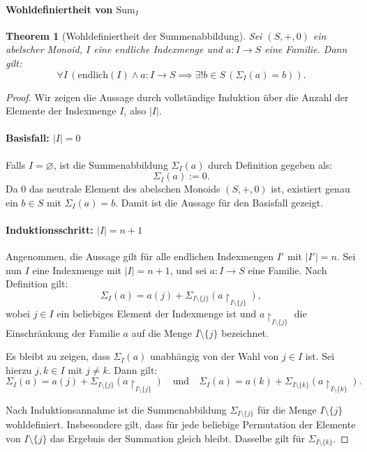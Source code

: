 \documentclass{book}
\theoremstyle{plain}
\newtheorem{theorem}{Theorem}
\theoremstyle{remark}
\theoremstyle{definition}
\begin{document}
\paragraph{Wohldefiniertheit von \(\text{Sum}_I\)}
\begin{theorem}[Wohldefiniertheit der Summenabbildung]
Sei \((S, +, 0)\) ein abelscher Monoid, \(I\) eine endliche Indexmenge und \(a \colon I \to S\) eine Familie. Dann gilt:
\[
\forall I \, (\text{endlich}(I) \land a \colon I \to S \implies \exists! b \in S \, (\Sigma_I(a) = b)).
\]
\end{theorem}
\begin{proof}
Wir zeigen die Aussage durch vollständige Induktion über die Anzahl der Elemente der Indexmenge \(I\), also \(|I|\).

\paragraph{Basisfall: \(|I| = 0\)}
Falls \(I = \varnothing\), ist die Summenabbildung \(\Sigma_I(a)\) durch Definition gegeben als:
\[
\Sigma_I(a) := 0.
\]
Da \(0\) das neutrale Element des abelschen Monoids \((S, +, 0)\) ist, existiert genau ein \(b \in S\) mit \(\Sigma_I(a) = b\). Damit ist die Aussage für den Basisfall gezeigt.

\paragraph{Induktionsschritt: \(|I| = n+1\)}
Angenommen, die Aussage gilt für alle endlichen Indexmengen \(I'\) mit \(|I'| = n\). Sei nun \(I\) eine Indexmenge mit \(|I| = n+1\), und sei \(a \colon I \to S\) eine Familie. Nach Definition gilt:
\[
\Sigma_I(a) = a(j) + \Sigma_{I \setminus \{j\}}(a\restriction_{I \setminus \{j\}}),
\]
wobei \(j \in I\) ein beliebiges Element der Indexmenge ist und \(a\restriction_{I \setminus \{j\}}\) die Einschränkung der Familie \(a\) auf die Menge \(I \setminus \{j\}\) bezeichnet.

Es bleibt zu zeigen, dass \(\Sigma_I(a)\) unabhängig von der Wahl von \(j \in I\) ist. Sei hierzu \(j, k \in I\) mit \(j \neq k\). Dann gilt:
\[
\Sigma_I(a) = a(j) + \Sigma_{I \setminus \{j\}}(a\restriction_{I \setminus \{j\}})
\quad \text{und} \quad
\Sigma_I(a) = a(k) + \Sigma_{I \setminus \{k\}}(a\restriction_{I \setminus \{k\}}).
\]

Nach Induktionsannahme ist die Summenabbildung \(\Sigma_{I \setminus \{j\}}\) für die Menge \(I \setminus \{j\}\) wohldefiniert. Insbesondere gilt, dass für jede beliebige Permutation der Elemente von \(I \setminus \{j\}\) das Ergebnis der Summation gleich bleibt. Dasselbe gilt für \(\Sigma_{I \setminus \{k\}}\).


\end{proof}
\end{document}

